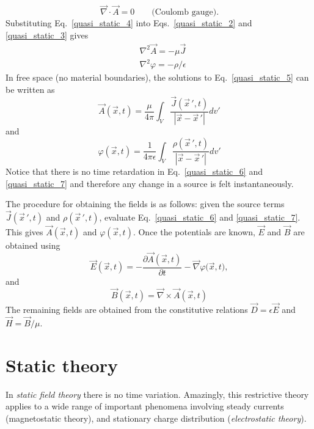 \documentclass[11pt,a4paper,oneside]{book}
\numberwithin{equation}{section}
\newcommand{\abs}[1]{\left|#1\right|}
\theoremstyle{it}
\theoremstyle{definition}
\begin{document}
\begin{equation}\label{quasi_static_4}
	\boxed{	\vec{\nabla}\cdot\vec{A}= 0\qquad\text{(Coulomb gauge).}}
\end{equation}
Substituting Eq.~\eqref{quasi_static_4} into Eqs.~\eqref{quasi_static_2} and \ref{quasi_static_3} gives
\begin{equation}\label{quasi_static_5}
\boxed{	\begin{aligned}
	&\nabla^2\vec{A} = -\mu\vec{J} \\[8pt]
	&\nabla^2\varphi = -\rho/\epsilon
	\end{aligned}}
\end{equation}
In free space (no material boundaries), the solutions to Eq.~\eqref{quasi_static_5} can be written as
\begin{equation}\label{quasi_static_6}
	\vec{A}(\vec{x},t)=\frac{\mu}{4\pi}\int_{V}\frac{\vec{J}(\vec{x}\,',t)}{\abs{\vec{x}- \vec{x}\,'}}dv'
\end{equation}
and
\begin{equation}\label{quasi_static_7}
	{\varphi}(\vec{x},t)=\frac{1}{4\pi\epsilon}\int_{V}\frac{\rho(\vec{x}\,',t)}{\abs{\vec{x}- \vec{x}\,'}}dv'
\end{equation}
Notice that there is no time retardation in Eq.~\eqref{quasi_static_6} and \ref{quasi_static_7} and therefore any change in a source is felt instantaneously.

The procedure for obtaining the fields is as follows: given the source terms $\vec{J}(\vec{x}\,',t)$ and $\rho(\vec{x}\,',t)$, evaluate Eq.~\eqref{quasi_static_6} and \ref{quasi_static_7}. This gives $\vec{A}(\vec{x},t)$ and ${\varphi}(\vec{x},t)$. Once the potentials are known, $\vec{E}$ and $\vec{B}$ are obtained using 
\begin{equation}\label{quasi_static_8}
	\vec{E}(\vec{x},t)= -\frac{\partial \vec{A}(\vec{x},t)}{\partial t} - \vec{\nabla}\varphi\big(\vec{x},t\big),
\end{equation}
and
\begin{equation}\label{quasi_static_9}
	\vec{B}(\vec{x},t)= \vec{\nabla}\times\vec{A}(\vec{x},t)
\end{equation}
The remaining fields are obtained from the constitutive relations $\vec{D}=\epsilon\vec{E}$ and $\vec{H}=\vec{B}/\mu$.

\section{Static theory}
In \textit{static field theory} there is no time variation. Amazingly, this restrictive theory applies to a wide range of important phenomena involving steady currents (magnetostatic theory), and stationary charge distribution (\textit{electrostatic theory}). 
\end{document}
